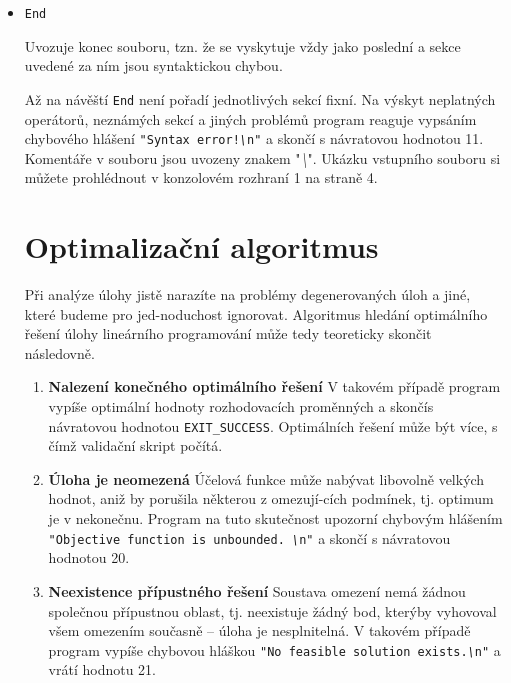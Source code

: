 \documentclass[
12pt,
a4paper,
pdftex,
czech,
titlepage
]{report}
\begin{document}
\begin{itemize}[label={}]
\item \texttt{End}
\hspace{4.2cm} \begin{minipage}[t]{0.56\textwidth} Uvozuje konec souboru, tzn. že se vyskytuje vždy jako poslední a
sekce uvedené za ním jsou syntaktickou chybou.
\end{minipage}


Až na návěští \texttt{End} není pořadí jednotlivých sekcí fixní. Na výskyt
neplatných operátorů, neznámých sekcí a jiných problémů program reaguje
vypsáním chybového hlášení \texttt{"Syntax error!\emph{\textbackslash{}}n"} a
skončí s návratovou hodnotou 11. Komentáře v souboru jsou uvozeny znakem
"\emph{\textbackslash{}}". Ukázku vstupního souboru si můžete
prohlédnout v konzolovém rozhraní 1 na straně 4.

\section*{Optimalizační algoritmus}

Při analýze úlohy jistě narazíte na problémy degenerovaných úloh a jiné,
které budeme pro jed-noduchost ignorovat. Algoritmus hledání optimálního
řešení úlohy lineárního programování může tedy teoreticky skončit
následovně.

\begin{enumerate}[label=\arabic*.]
\item \textbf{Nalezení konečného optimálního řešení}
V takovém případě program vypíše optimální hodnoty rozhodovacích
proměnných a skončís návratovou hodnotou \texttt{EXIT\_SUCCESS}. Optimálních řešení může být více, s čímž
validační skript počítá.

\item \textbf{Úloha je neomezená}
Účelová funkce může nabývat libovolně velkých hodnot, aniž by porušila
některou z omezují-cích podmínek, tj. optimum je v nekonečnu. Program na
tuto skutečnost upozorní chybovým hlášením \texttt{"Objective function is
unbounded. \emph{\textbackslash{}}n"} a skončí s návratovou hodnotou 20.

\item \textbf{Neexistence přípustného řešení}
Soustava omezení nemá žádnou společnou přípustnou oblast, tj. neexistuje
žádný bod, kterýby vyhovoval všem omezením současně -- úloha je
nesplnitelná. V takovém případě program vypíše chybovou hláškou \texttt{"No
feasible solution exists.\emph{\textbackslash{}}n"} a vrátí hodnotu 21.
\end{enumerate}



\end{itemize}
\end{document}
